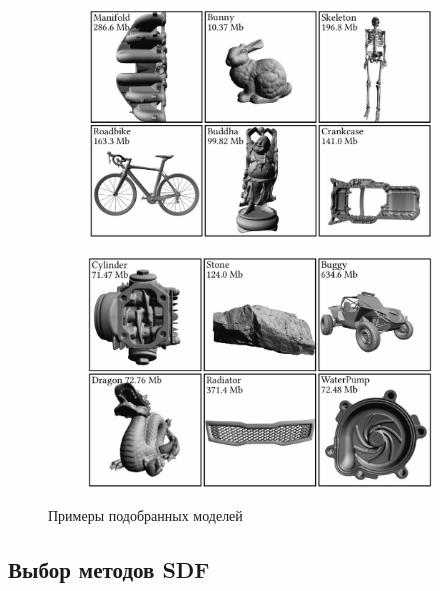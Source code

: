 \documentclass[a4paper,hidelinks,12pt]{article}
\begin{document}
\begin{figure}[htp]
	\centering

	\begin{subfigure}{0.8\linewidth}
			\includegraphics[width=\linewidth]{img1.jpg}
	\end{subfigure}
	
	\vfill %
	
	\begin{subfigure}{0.8\linewidth}
			\includegraphics[width=\linewidth]{img2.jpg}
	\end{subfigure}

	\caption{Примеры подобранных моделей}
\end{figure}

\newpage

\subsection{Выбор методов SDF}
\end{document}
